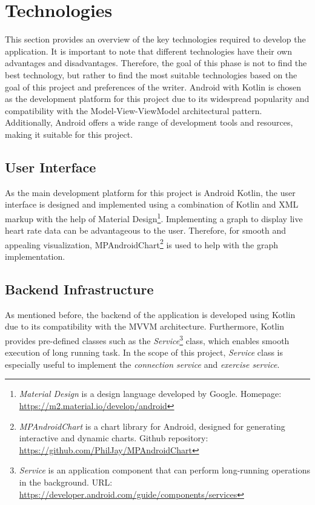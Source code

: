 \section{Technologies}
This section provides an overview of the key technologies required to develop the application. It is important to note that different technologies have their own advantages and disadvantages. Therefore, the goal of this phase is not to find the best technology, but rather to find the most suitable technologies based on the goal of this project and preferences of the writer. 
Android with Kotlin is chosen as the development platform for this project due to its widespread popularity and compatibility with the Model-View-ViewModel architectural pattern. Additionally, Android offers a wide range of development tools and resources, making it suitable for this project.

\subsection{User Interface}
As the main development platform for this project is Android Kotlin, the user interface is designed and implemented using a combination of Kotlin and XML markup with the help of Material Design\footnote{\emph{Material Design} is a design language developed by Google. Homepage: \url{https://m2.material.io/develop/android}}.
Implementing a graph to display live heart rate data can be advantageous to the user. Therefore, for smooth and appealing visualization, MPAndroidChart\footnote{\emph{MPAndroidChart} is a chart library for Android, designed for generating interactive and dynamic charts. Github repository: \url{https://github.com/PhilJay/MPAndroidChart}} is used to help with the graph implementation.
\subsection{Backend Infrastructure}
As mentioned before, the backend of the application is developed using Kotlin due to its compatibility with the MVVM architecture. 
Furthermore, Kotlin provides pre-defined classes such as the \emph{Service}\footnote{\emph{Service} is an application component that can perform long-running operations in the background. URL: \url{https://developer.android.com/guide/components/services}} class, which enables smooth execution of long running task. In the scope of this project, \emph{Service} class is especially useful to implement the \emph{connection service} and \emph{exercise service}.

